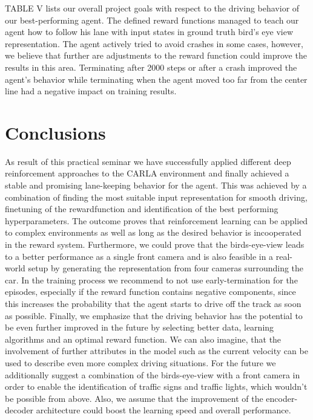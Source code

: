 \documentclass[letterpaper, 10 pt, conference]{ieeeconf}  %
\begin{document}
TABLE V lists our overall project goals with respect to the driving behavior of our best-performing agent. 
The defined reward functions managed to teach our agent how to follow his lane with input states in ground truth bird's eye view representation.
The agent actively tried to avoid crashes in some cases, however, we believe that further are adjustments to the reward function could improve 
the results in this area. Terminating after 2000 steps or after a crash improved the agent's behavior while terminating when the agent moved too far
from the center line had a negative impact on training results.


\section{Conclusions}
As result of this practical seminar we have successfully applied different deep reinforcement 
approaches to the CARLA environment and finally achieved a stable and promising lane-keeping behavior 
for the agent. This was achieved by a combination of finding the most suitable input representation for 
smooth driving, finetuning of the rewardfunction and identification of the best performing hyperparameters. 
The outcome proves that reinforcement learning can be applied to complex environments as well as long as the 
desired behavior is incooperated in the reward system. Furthermore, we could prove that the birds-eye-view leads 
to a better performance as a single front camera and is also feasible in a real-world setup by generating the 
representation from four cameras surrounding the car. In the training process we recommend to not use early-termination 
for the episodes, especially if the reward function contains negative components, since this increases the probability that 
the agent starts to drive off the track as soon as possible. Finally, we emphasize that the driving behavior has the potential 
to be even further improved in the future by selecting better data, learning algorithms and an optimal reward function. 
We can also imagine, that the involvement of further attributes in the model such as the current velocity can be used 
to describe even more complex driving situations.  \newline
For the future we additionally suggest a combination of the birds-eye-view with a front camera 
in order to enable the identification of traffic signs and traffic lights, which wouldn't be 
possible from above. Also, we assume that the improvement of the encoder-decoder 
architecture could boost the learning speed and overall performance.
\end{document}
